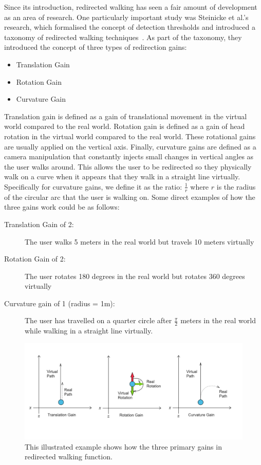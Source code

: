 Since its introduction, redirected walking has seen a fair amount of development as an area of research. One particularly important study was Steinicke et al.'s research, which formalised the concept of detection thresholds and introduced a taxonomy of redirected walking techniques~\cite{5072212}. As part of the taxonomy, they introduced the concept of three types of redirection gains:
\begin{itemize}
    \item Translation Gain
    \item Rotation Gain
    \item Curvature Gain
\end{itemize}

Translation gain is defined as a gain of translational movement in the virtual world compared to the real world. Rotation gain is defined as a gain of head rotation in the virtual world compared to the real world. These rotational gains are usually applied on the vertical axis. Finally, curvature gains are defined as a camera manipulation that constantly injects small changes in vertical angles as the user walks around. This allows the user to be redirected so they physically walk on a curve when it appears that they walk in a straight line virtually. Specifically for curvature gains, we define it as the ratio: $\frac{1}{r}$ where $r$ is the radius of the circular arc that the user is walking on. Some direct examples of how the three gains work could be as follows:
\begin{description}
    \item[Translation Gain of 2:] The user walks 5 meters in the real world but travels 10 meters virtually
    \item[Rotation Gain of 2:] The user rotates 180 degrees in the real world but rotates 360 degrees virtually
    \item[Curvature gain of 1 (radius = 1m):] The user has travelled on a quarter circle after $\frac{\pi}{2}$ meters in the real world while walking in a straight line virtually.
\end{description}

\begin{figure}[tbph]
    \centering
    \includegraphics[width=1.0\textwidth]{figures/graphs/redirectionGains.png}
    \caption[Illustrated Example of How Redirection Gains Function]{This illustrated example shows how the three primary gains in redirected walking function.}
    \label{fig:redirectionGainsExample}
\end{figure}

